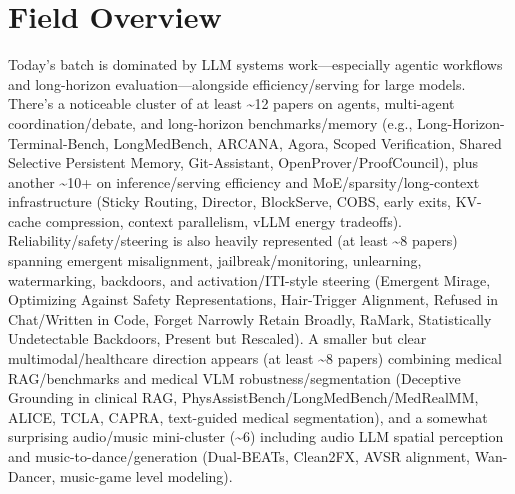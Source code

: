 \documentclass[12pt,letterpaper]{article}
\begin{document}
\section*{Field Overview}
{\footnotesize Today's batch is dominated by LLM systems work---especially agentic workflows and long-horizon evaluation---alongside efficiency/serving for large models. There's a noticeable cluster of at least \textasciitilde{}12 papers on agents, multi-agent coordination/debate, and long-horizon benchmarks/memory (e.g., Long-Horizon-Terminal-Bench, LongMedBench, ARCANA, Agora, Scoped Verification, Shared Selective Persistent Memory, Git-Assistant, OpenProver/ProofCouncil), plus another \textasciitilde{}10+ on inference/serving efficiency and MoE/sparsity/long-context infrastructure (Sticky Routing, Director, BlockServe, COBS, early exits, KV-cache compression, context parallelism, vLLM energy tradeoffs). Reliability/safety/steering is also heavily represented (at least \textasciitilde{}8 papers) spanning emergent misalignment, jailbreak/monitoring, unlearning, watermarking, backdoors, and activation/ITI-style steering (Emergent Mirage, Optimizing Against Safety Representations, Hair-Trigger Alignment, Refused in Chat/Written in Code, Forget Narrowly Retain Broadly, RaMark, Statistically Undetectable Backdoors, Present but Rescaled). A smaller but clear multimodal/healthcare direction appears (at least \textasciitilde{}8 papers) combining medical RAG/benchmarks and medical VLM robustness/segmentation (Deceptive Grounding in clinical RAG, PhysAssistBench/LongMedBench/MedRealMM, ALICE, TCLA, CAPRA, text-guided medical segmentation), and a somewhat surprising audio/music mini-cluster (\textasciitilde{}6) including audio LLM spatial perception and music-to-dance/generation (Dual-BEATs, Clean2FX, AVSR alignment, Wan-Dancer, music-game level modeling).}
\end{document}

